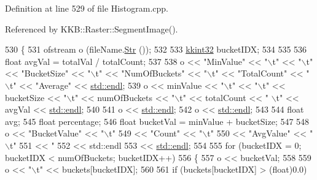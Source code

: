 Definition at line 529 of file Histogram.\+cpp.



Referenced by K\+K\+B\+::\+Raster\+::\+Segment\+Image().


\begin{DoxyCode}
530 \{
531   ofstream o (fileName.\hyperlink{class_k_k_b_1_1_k_k_str_ad574e6c0fe7f6ce1ba3ab0a8ce2fbd52}{Str} ());
532 
533   \hyperlink{namespace_k_k_b_a8fa4952cc84fda1de4bec1fbdd8d5b1b}{kkint32}  bucketIDX;
534 
535 
536   \textcolor{keywordtype}{float}  avgVal = totalVal / totalCount;
537 
538   o << \textcolor{stringliteral}{"MinValue"} << \textcolor{stringliteral}{"\(\backslash\)t"} << \textcolor{stringliteral}{"\(\backslash\)t"} << \textcolor{stringliteral}{"BucketSize"}  << \textcolor{stringliteral}{"\(\backslash\)t"}  << \textcolor{stringliteral}{"NumOfBuckets"} << \textcolor{stringliteral}{"\(\backslash\)t"} << \textcolor{stringliteral}{"TotalCount"} << \textcolor{stringliteral}{"
      \(\backslash\)t"} << \textcolor{stringliteral}{"Average"}  << \hyperlink{namespace_k_k_b_ad1f50f65af6adc8fa9e6f62d007818a8}{std::endl};
539   o <<  minValue  << \textcolor{stringliteral}{"\(\backslash\)t"} << \textcolor{stringliteral}{"\(\backslash\)t"} <<  bucketSize   << \textcolor{stringliteral}{"\(\backslash\)t"}  <<  numOfBuckets  << \textcolor{stringliteral}{"\(\backslash\)t"} <<  totalCount  << \textcolor{stringliteral}{"
      \(\backslash\)t"} <<  avgVal    << \hyperlink{namespace_k_k_b_ad1f50f65af6adc8fa9e6f62d007818a8}{std::endl};
540 
541   o << \hyperlink{namespace_k_k_b_ad1f50f65af6adc8fa9e6f62d007818a8}{std::endl};
542   o << \hyperlink{namespace_k_k_b_ad1f50f65af6adc8fa9e6f62d007818a8}{std::endl};
543 
544   \textcolor{keywordtype}{float}  avg;
545   \textcolor{keywordtype}{float}  percentage;
546   \textcolor{keywordtype}{float}  bucketVal = minValue + bucketSize;
547 
548   o << \textcolor{stringliteral}{"BucketValue"}  << \textcolor{stringliteral}{"\(\backslash\)t"}
549     << \textcolor{stringliteral}{"Count"}        << \textcolor{stringliteral}{"\(\backslash\)t"}
550     << \textcolor{stringliteral}{"AvgValue"}     << \textcolor{stringliteral}{"\(\backslash\)t"}
551     << \textcolor{stringliteral}{"%
552     << std::endl
553     << \hyperlink{namespace_k_k_b_ad1f50f65af6adc8fa9e6f62d007818a8}{std::endl};
554 
555   \textcolor{keywordflow}{for}  (bucketIDX = 0;  bucketIDX < numOfBuckets;  bucketIDX++)
556   \{
557     o << bucketVal;
558 
559     o << \textcolor{stringliteral}{"\(\backslash\)t"} << buckets[bucketIDX];
560 
561     \textcolor{keywordflow}{if}  (buckets[bucketIDX] > (\textcolor{keywordtype}{float})0.0)
}
\end{DoxyCode}

